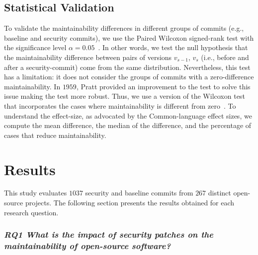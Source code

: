 \documentclass[10pt,conference]{IEEEtran}
\begin{document}
\subsection{Statistical Validation}\label{sec:statsval}
%
To validate the maintainability differences in different groups of commits
(e.g., baseline and security commits), we use the Paired Wilcoxon signed-rank
test with the significance level $\alpha = 0.05$~\cite{10.2307/3001968}. In
other words, we test the null hypothesis that the maintainability difference
between pairs of versions $v_{s-1}$, $v_s$ (i.e., before and after a
security-commit) come from the same distribution. Nevertheless, this test has a
limitation: it does not consider the groups of commits with a zero-difference
maintainability. In $1959$, Pratt provided an improvement to the test to solve
this issue making the test more robust. Thus, we use a version of the Wilcoxon
test that incorporates the cases where maintainability is different from zero~\cite{10.2307/2282543}.
To understand the effect-size, as
advocated by the Common-language effect sizes\cite{graw:1992}, we compute the
mean difference, the median of the difference, and the percentage of cases that
reduce maintainability.
%
\section{Results}\label{sec:results}

This study evaluates $1037$ security and baseline commits
from $267$ distinct open-source projects. The following section presents the
results obtained for each research question.

\subsubsection*{\textit{\textbf{RQ1} \textbf{What is the impact of security patches on the
maintainability of open-source software?}}}
\end{document}
